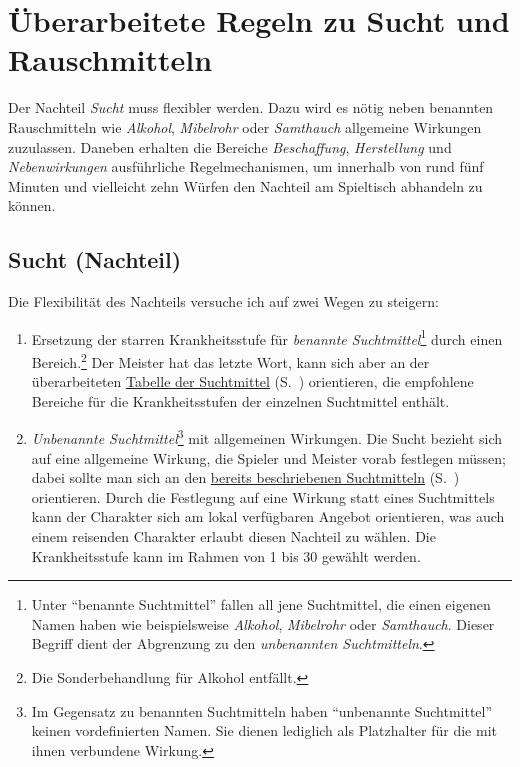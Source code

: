 \section{Überarbeitete Regeln zu Sucht und Rauschmitteln}
Der Nachteil \emph{Sucht} muss flexibler werden. Dazu wird es nötig neben benannten Rauschmitteln wie \emph{Alkohol}, \emph{Mibelrohr} oder \emph{Samthauch} allgemeine Wirkungen zuzulassen. Daneben erhalten die Bereiche \emph{Beschaffung}, \emph{Herstellung} und \emph{Nebenwirkungen} ausführliche Regelmechanismen, um innerhalb von rund fünf Minuten und vielleicht zehn Würfen den Nachteil am Spieltisch abhandeln zu können.

\subsection{Sucht (Nachteil)}
Die Flexibilität des Nachteils versuche ich auf zwei Wegen zu steigern:
\begin{enumerate}
	\item Ersetzung der starren Krankheitsstufe für \emph{benannte Suchtmittel}\footnote{Unter \enquote{benannte Suchtmittel} fallen all jene Suchtmittel, die einen eigenen Namen haben wie beispielsweise \emph{Alkohol}, \emph{Mibelrohr} oder \emph{Samthauch}. Dieser Begriff dient der Abgrenzung zu den \emph{unbenannten Suchtmitteln}.} durch einen Bereich.\footnote{Die Sonderbehandlung für Alkohol entfällt.} Der Meister hat das letzte Wort, kann sich aber an der überarbeiteten \hyperref[tbl-suchtmittel-revised]{Tabelle der Suchtmittel} (S.~\pageref{tbl-suchtmittel-revised}) orientieren, die empfohlene Bereiche für die Krankheitsstufen der einzelnen Suchtmittel enthält.
	\item \emph{Unbenannte Suchtmittel}\footnote{Im Gegensatz zu benannten Suchtmitteln haben \enquote{unbenannte Suchtmittel} keinen vordefinierten Namen. Sie dienen lediglich als Platzhalter für die mit ihnen verbundene Wirkung.} mit allgemeinen Wirkungen. Die Sucht bezieht sich auf eine allgemeine Wirkung, die Spieler und Meister vorab festlegen müssen; dabei sollte man sich an den \hyperref[tbl-suchtmittel]{bereits beschriebenen Suchtmitteln} (S.~\pageref{tbl-suchtmittel}) orientieren. Durch die Festlegung auf eine Wirkung statt eines Suchtmittels kann der Charakter sich am lokal verfügbaren Angebot orientieren, was auch einem reisenden Charakter erlaubt diesen Nachteil zu wählen. Die Krankheitsstufe kann im Rahmen von 1 bis 30 gewählt werden.
\end{enumerate}

